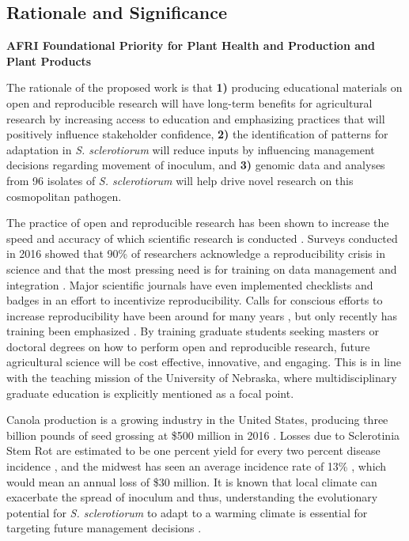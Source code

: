 \documentclass[12pt,letterpaper]{article}
\begin{document}
\subsection{Rationale and Significance}


\noindent
\textbf{AFRI Foundational Priority for Plant Health and Production and Plant Products}

The rationale of the proposed work is that 
\textbf{1)} producing educational materials on open and reproducible research will have long-term benefits for agricultural research by increasing access to education and emphasizing practices that will positively influence stakeholder confidence, 
\textbf{2)} the identification of patterns for adaptation in \textit{S. sclerotiorum} will reduce inputs by influencing management decisions regarding movement of inoculum, and 
\textbf{3)} genomic data and analyses from 96 isolates of \textit{S. sclerotiorum} will help drive novel research on this cosmopolitan pathogen. 

The practice of open and reproducible research has been shown to increase the speed and accuracy of which scientific research is conducted \citep{stewart-lowndes2017path, wilson2016good}.
Surveys conducted in 2016 showed that 90\% of researchers acknowledge a reproducibility crisis in science \citep{baker2016scientists} and that the most pressing need is for training on data management and integration \citep{barone2017unmet}. 
Major scientific journals have even implemented checklists \citep{nature2017announcement} and badges \citep{kidwell2016badges} in an effort to incentivize reproducibility.
Calls for conscious efforts to increase reproducibility have been around for many years \citep{buckheit1995wavelab, peng2011reproducible}, but only recently has training been emphasized \citep{schmidt2016stepping, stewart-lowndes2017path, wilson2016good}. 
By training graduate students seeking masters or doctoral degrees on how to perform open and reproducible research, future agricultural science will be cost effective, innovative, and engaging. 
This is in line with the teaching mission of the University of Nebraska, where multidisciplinary graduate education is explicitly mentioned as a focal point.

Canola production is a growing industry in the United States, producing three billion pounds of seed grossing at \$500 million in 2016 \citep{usda2017production, usda2017values}. Losses due to Sclerotinia Stem Rot are estimated to be one percent yield for every two percent disease incidence \citep{delrio2007impact}, and the midwest has seen an average incidence rate of 13\% \citep{markell2009sclerotinia}, which would mean an annual loss of \$30 million. 
It is known that local climate can exacerbate the spread of inoculum and thus, understanding the evolutionary potential for \textit{S. sclerotiorum} to adapt to a warming climate is essential for targeting future management decisions \citep{attanayake2014inferring,shea2000integrated,billiard2012sex}.
\end{document}
